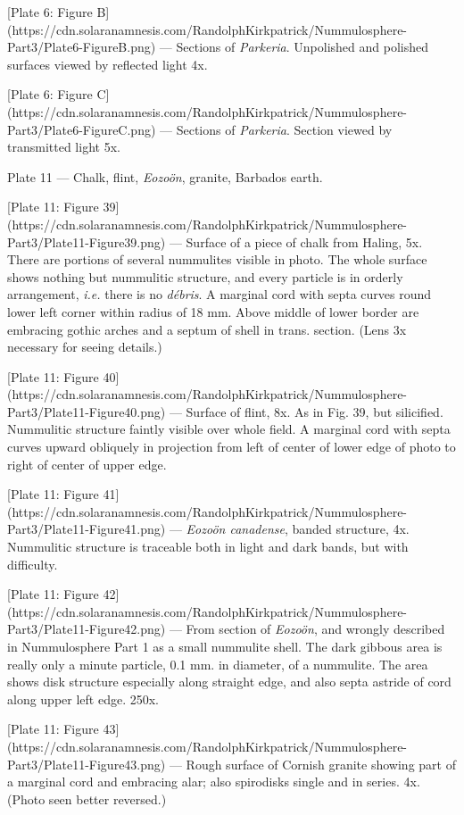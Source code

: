 \documentclass[a4paper, 12pt, oneside]{article}
\begin{document}
[Plate 6: Figure B](https://cdn.solaranamnesis.com/RandolphKirkpatrick/Nummulosphere-Part3/Plate6-FigureB.png) --- Sections of \emph{Parkeria}. Unpolished and polished surfaces viewed by reflected light 4x.

[Plate 6: Figure C](https://cdn.solaranamnesis.com/RandolphKirkpatrick/Nummulosphere-Part3/Plate6-FigureC.png) --- Sections of \emph{Parkeria}. Section viewed by transmitted light 5x.

Plate 11 --- Chalk, flint, \emph{Eozoön}, granite, Barbados earth.

[Plate 11: Figure 39](https://cdn.solaranamnesis.com/RandolphKirkpatrick/Nummulosphere-Part3/Plate11-Figure39.png) --- Surface of a piece of chalk from Haling, 5x. There are portions of several nummulites visible in photo. The whole surface shows nothing but nummulitic structure, and every particle is in orderly arrangement, \emph{i.e.} there is no \emph{débris}. A marginal cord with septa curves round lower left corner within radius of 18 mm. Above middle of lower border are embracing gothic arches and a septum of shell in trans. section. (Lens 3x necessary for seeing details.)

[Plate 11: Figure 40](https://cdn.solaranamnesis.com/RandolphKirkpatrick/Nummulosphere-Part3/Plate11-Figure40.png) --- Surface of flint, 8x. As in Fig. 39, but silicified. Nummulitic structure faintly visible over whole field. A marginal cord with septa curves upward obliquely in projection from left of center of lower edge of photo to right of center of upper edge.

[Plate 11: Figure 41](https://cdn.solaranamnesis.com/RandolphKirkpatrick/Nummulosphere-Part3/Plate11-Figure41.png) --- \emph{Eozoön canadense}, banded structure, 4x. Nummulitic structure is traceable both in light and dark bands, but with difficulty.

[Plate 11: Figure 42](https://cdn.solaranamnesis.com/RandolphKirkpatrick/Nummulosphere-Part3/Plate11-Figure42.png) --- From section of \emph{Eozoön}, and wrongly described in Nummulosphere Part 1 as a small nummulite shell. The dark gibbous area is really only a minute particle, 0.1 mm. in diameter, of a nummulite. The area shows disk structure especially along straight edge, and also septa astride of cord along upper left edge. 250x.

[Plate 11: Figure 43](https://cdn.solaranamnesis.com/RandolphKirkpatrick/Nummulosphere-Part3/Plate11-Figure43.png) --- Rough surface of Cornish granite showing part of a marginal cord and embracing alar; also spirodisks single and in series. 4x. (Photo seen better reversed.)
\end{document}
